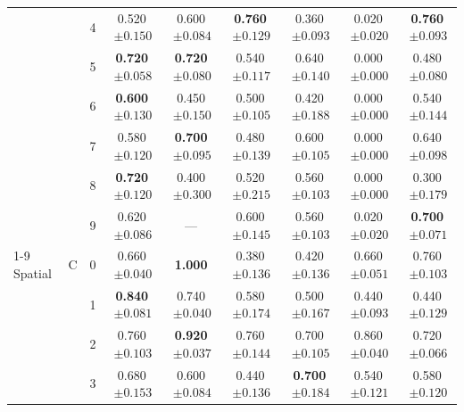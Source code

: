 \begin{longtable}{lllcccccc}
 &  & 4 & 0.520$\,{\scriptstyle\pm0.150}$ & 0.600$\,{\scriptstyle\pm0.084}$ & \textbf{0.760}$\,{\scriptstyle\pm0.129}$ & 0.360$\,{\scriptstyle\pm0.093}$ & 0.020$\,{\scriptstyle\pm0.020}$ & \textbf{0.760}$\,{\scriptstyle\pm0.093}$ \\
 &  & 5 & \textbf{0.720}$\,{\scriptstyle\pm0.058}$ & \textbf{0.720}$\,{\scriptstyle\pm0.080}$ & 0.540$\,{\scriptstyle\pm0.117}$ & 0.640$\,{\scriptstyle\pm0.140}$ & 0.000$\,{\scriptstyle\pm0.000}$ & 0.480$\,{\scriptstyle\pm0.080}$ \\
 &  & 6 & \textbf{0.600}$\,{\scriptstyle\pm0.130}$ & 0.450$\,{\scriptstyle\pm0.150}$ & 0.500$\,{\scriptstyle\pm0.105}$ & 0.420$\,{\scriptstyle\pm0.188}$ & 0.000$\,{\scriptstyle\pm0.000}$ & 0.540$\,{\scriptstyle\pm0.144}$ \\
 &  & 7 & 0.580$\,{\scriptstyle\pm0.120}$ & \textbf{0.700}$\,{\scriptstyle\pm0.095}$ & 0.480$\,{\scriptstyle\pm0.139}$ & 0.600$\,{\scriptstyle\pm0.105}$ & 0.000$\,{\scriptstyle\pm0.000}$ & 0.640$\,{\scriptstyle\pm0.098}$ \\
 &  & 8 & \textbf{0.720}$\,{\scriptstyle\pm0.120}$ & 0.400$\,{\scriptstyle\pm0.300}$ & 0.520$\,{\scriptstyle\pm0.215}$ & 0.560$\,{\scriptstyle\pm0.103}$ & 0.000$\,{\scriptstyle\pm0.000}$ & 0.300$\,{\scriptstyle\pm0.179}$ \\
 &  & 9 & 0.620$\,{\scriptstyle\pm0.086}$ & --- & 0.600$\,{\scriptstyle\pm0.145}$ & 0.560$\,{\scriptstyle\pm0.103}$ & 0.020$\,{\scriptstyle\pm0.020}$ & \textbf{0.700}$\,{\scriptstyle\pm0.071}$ \\
\cmidrule(lr){1-9}
Spatial & C & 0 & 0.660$\,{\scriptstyle\pm0.040}$ & \textbf{1.000} & 0.380$\,{\scriptstyle\pm0.136}$ & 0.420$\,{\scriptstyle\pm0.136}$ & 0.660$\,{\scriptstyle\pm0.051}$ & 0.760$\,{\scriptstyle\pm0.103}$ \\
 &  & 1 & \textbf{0.840}$\,{\scriptstyle\pm0.081}$ & 0.740$\,{\scriptstyle\pm0.040}$ & 0.580$\,{\scriptstyle\pm0.174}$ & 0.500$\,{\scriptstyle\pm0.167}$ & 0.440$\,{\scriptstyle\pm0.093}$ & 0.440$\,{\scriptstyle\pm0.129}$ \\
 &  & 2 & 0.760$\,{\scriptstyle\pm0.103}$ & \textbf{0.920}$\,{\scriptstyle\pm0.037}$ & 0.760$\,{\scriptstyle\pm0.144}$ & 0.700$\,{\scriptstyle\pm0.105}$ & 0.860$\,{\scriptstyle\pm0.040}$ & 0.720$\,{\scriptstyle\pm0.066}$ \\
 &  & 3 & 0.680$\,{\scriptstyle\pm0.153}$ & 0.600$\,{\scriptstyle\pm0.084}$ & 0.440$\,{\scriptstyle\pm0.136}$ & \textbf{0.700}$\,{\scriptstyle\pm0.184}$ & 0.540$\,{\scriptstyle\pm0.121}$ & 0.580$\,{\scriptstyle\pm0.120}$ \\

\end{longtable}
